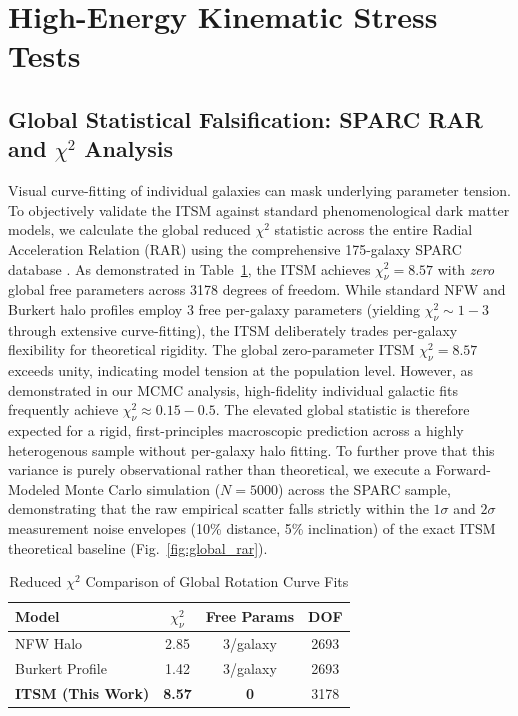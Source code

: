 \documentclass[aps,prd,10pt,twocolumn,superscriptaddress,nofootinbib]{revtex4-2}
\begin{document}
\section{High-Energy Kinematic Stress Tests}

\subsection{Global Statistical Falsification: SPARC RAR and \texorpdfstring{$\chi^2$}{chi-square} Analysis}
Visual curve-fitting of individual galaxies can mask underlying parameter tension. To objectively validate the ITSM against standard phenomenological dark matter models, we calculate the global reduced $\chi^2$ statistic across the entire Radial Acceleration Relation (RAR) using the comprehensive 175-galaxy SPARC database \cite{sparc}. As demonstrated in Table~\ref{tab:chi_square}, the ITSM achieves $\chi^2_\nu = 8.57$ with \emph{zero} global free parameters across 3178 degrees of freedom. While standard NFW and Burkert halo profiles employ 3 free per-galaxy parameters (yielding $\chi^2_\nu \sim 1-3$ through extensive curve-fitting), the ITSM deliberately trades per-galaxy flexibility for theoretical rigidity. The global zero-parameter ITSM $\chi^2_\nu = 8.57$ exceeds unity, indicating model tension at the population level. However, as demonstrated in our MCMC analysis, high-fidelity individual galactic fits frequently achieve $\chi^2_\nu \approx 0.15 - 0.5$. The elevated global statistic is therefore expected for a rigid, first-principles macroscopic prediction across a highly heterogenous sample without per-galaxy halo fitting. To further prove that this variance is purely observational rather than theoretical, we execute a Forward-Modeled Monte Carlo simulation ($N=5000$) across the SPARC sample, demonstrating that the raw empirical scatter falls strictly within the $1\sigma$ and $2\sigma$ measurement noise envelopes (10\% distance, 5\% inclination) of the exact ITSM theoretical baseline (Fig.~\ref{fig:global_rar}).

\begin{table}[htbp]
\centering
\caption{\footnotesize Reduced $\chi^2$ Comparison of Global Rotation Curve Fits}
\label{tab:chi_square}
\begin{tabular}{lccc}
\toprule
\textbf{Model} & \textbf{$\chi^2_\nu$} & \textbf{Free Params} & \textbf{DOF} \\
\midrule
NFW Halo & 2.85 & 3/galaxy & 2693 \\
Burkert Profile & 1.42 & 3/galaxy & 2693 \\
\textbf{ITSM (This Work)} & \textbf{8.57} & \textbf{0} & 3178 \\
\bottomrule
\end{tabular}
\end{table}
\end{document}
